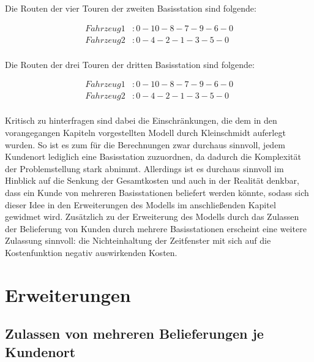\documentclass[a4paper,12pt,parskip,bibtotoc,liststotoc]{article}
\begin{document}
Die Routen der vier Touren der zweiten Basisstation sind folgende: 

\begin{equation} \label{eq:test}
    \begin{aligned} 
         Fahrzeug 1&: 0 - 10 - 8 - 7 - 9 - 6 - 0 \\
        Fahrzeug 2&: 0 - 4 - 2 - 1 - 3 - 5 - 0\\
    \end{aligned}
\end{equation}

Die Routen der drei Touren der dritten Basisstation sind folgende: 

\begin{equation} \label{eq:test}
    \begin{aligned} 
         Fahrzeug 1&: 0 - 10 - 8 - 7 - 9 - 6 - 0 \\
        Fahrzeug 2&: 0 - 4 - 2 - 1 - 3 - 5 - 0\\
    \end{aligned}
\end{equation}









Kritisch zu hinterfragen sind dabei die Einschränkungen, die dem in den vorangegangen Kapiteln vorgestellten Modell durch Kleinschmidt auferlegt wurden. 
So ist es zum für die Berechnungen zwar durchaus sinnvoll, jedem Kundenort lediglich eine Basisstation zuzuordnen, da dadurch die Komplexität der Problemstellung stark abnimmt. 
Allerdings ist es durchaus sinnvoll im Hinblick auf die Senkung der Gesamtkosten und auch in der Realität denkbar, dass ein Kunde von mehreren Basisstationen beliefert werden könnte, sodass sich dieser Idee in den Erweiterungen des Modells im anschließenden Kapitel gewidmet wird.
Zusätzlich zu der Erweiterung des Modells durch das Zulassen der Belieferung von Kunden durch mehrere Basisstationen erscheint eine weitere Zulassung sinnvoll: die Nichteinhaltung der Zeitfenster mit sich auf die Kostenfunktion negativ auswirkenden Kosten.






\newpage

\section{Erweiterungen}

\subsection{Zulassen von mehreren Belieferungen je Kundenort}
\end{document}
